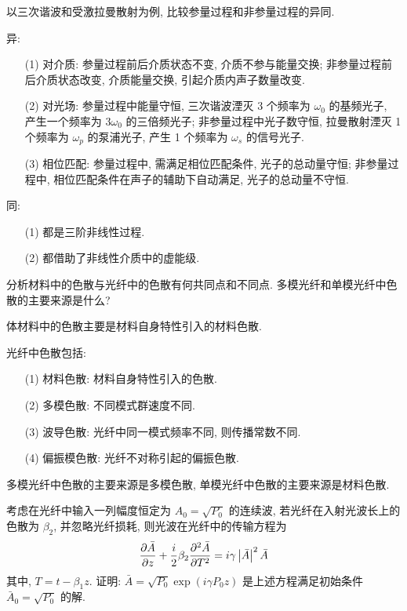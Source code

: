 \documentclass{assignment}
\begin{document}
\begin{prob}
    以三次谐波和受激拉曼散射为例, 比较参量过程和非参量过程的异同.
\end{prob}
\begin{sol}
    异:
    \begin{itemize}
        \item[(1)] 对介质: 参量过程前后介质状态不变, 介质不参与能量交换; 非参量过程前后介质状态改变, 介质能量交换, 引起介质内声子数量改变.
        \item[(2)] 对光场: 参量过程中能量守恒, 三次谐波湮灭 3 个频率为 $\omega_0$ 的基频光子, 产生一个频率为 $3\omega_0$ 的三倍频光子; 非参量过程中光子数守恒, 拉曼散射湮灭 1 个频率为 $\omega_p$ 的泵浦光子, 产生 1 个频率为 $\omega_s$ 的信号光子.
        \item[(3)] 相位匹配: 参量过程中, 需满足相位匹配条件, 光子的总动量守恒; 非参量过程中, 相位匹配条件在声子的辅助下自动满足, 光子的总动量不守恒.
    \end{itemize}

    同:
    \begin{itemize}
        \item[(1)] 都是三阶非线性过程.
        \item[(2)] 都借助了非线性介质中的虚能级.
    \end{itemize}
\end{sol}

\begin{prob}
    分析材料中的色散与光纤中的色散有何共同点和不同点. 多模光纤和单模光纤中色散的主要来源是什么?
\end{prob}
\begin{sol}
    体材料中的色散主要是材料自身特性引入的材料色散.

    光纤中色散包括:
    \begin{itemize}
        \item[(1)] 材料色散: 材料自身特性引入的色散.
        \item[(2)] 多模色散: 不同模式群速度不同.
        \item[(3)] 波导色散: 光纤中同一模式频率不同, 则传播常数不同.
        \item[(4)] 偏振模色散: 光纤不对称引起的偏振色散.
    \end{itemize}

    多模光纤中色散的主要来源是多模色散, 单模光纤中色散的主要来源是材料色散.
\end{sol}

\begin{prob}
    考虑在光纤中输入一列幅度恒定为 $A_0=\sqrt{P_0}$ 的连续波, 若光纤在入射光波长上的色散为 $\beta_2$, 并忽略光纤损耗, 则光波在光纤中的传输方程为
    \[
        \frac{\partial\bar{A}}{\partial z}+\frac{i}{2}\beta_2\frac{\partial^2\bar{A}}{\partial T^2}=i\gamma\left\lvert\bar{A}\right\rvert^2\bar{A}
    \]
    其中, $T=t-\beta_1z$. 证明: $\bar{A}=\sqrt{P_0}\exp(i\gamma P_0z)$ 是上述方程满足初始条件 $\bar{A}_0=\sqrt{P_0}$ 的解.
\end{prob}
\begin{pf}
    
\end{pf}
\end{document}
